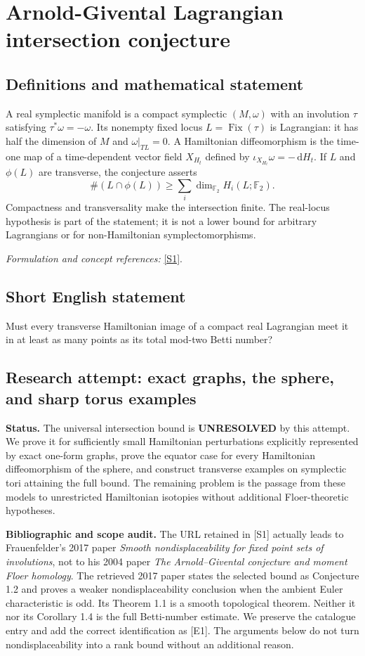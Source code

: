 \documentclass[11pt]{article}
\begin{document}
\section*{\texorpdfstring{Arnold-Givental Lagrangian intersection conjecture}{Arnold-Givental Lagrangian intersection conjecture}}\label{395}
\subsection{Definitions and mathematical statement}
A real symplectic manifold is a compact symplectic $(M,\omega)$ with an involution $\tau$ satisfying $\tau^*\omega=-\omega$. Its nonempty fixed locus $L=\operatorname{Fix}(\tau)$ is Lagrangian: it has half the dimension of $M$ and $\omega|_{TL}=0$. A Hamiltonian diffeomorphism is the time-one map of a time-dependent vector field $X_{H_t}$ defined by $\iota_{X_{H_t}}\omega=-{\,\mathrm{d}} H_t$. If $L$ and $\phi(L)$ are transverse, the conjecture asserts
\[
 \#(L\cap\phi(L))\ge\sum_i\dim_{{\mathbb{F}}_2}H_i(L;{\mathbb{F}}_2).
\]
Compactness and transversality make the intersection finite. The real-locus hypothesis is part of the statement; it is not a lower bound for arbitrary Lagrangians or for non-Hamiltonian symplectomorphisms.
\par\smallskip\textit{Formulation and concept references:} \href{https://arxiv.org/html/1708.09628v1}{[S1]}.

\subsection{Short English statement}
Must every transverse Hamiltonian image of a compact real Lagrangian meet it in at least as many points as its total mod-two Betti number?
\subsection{Research attempt: exact graphs, the sphere, and sharp torus examples}
\textbf{Status.} The universal intersection bound is \textbf{UNRESOLVED} by this attempt. We prove it for sufficiently small Hamiltonian perturbations explicitly represented by exact one-form graphs, prove the equator case for every Hamiltonian diffeomorphism of the sphere, and construct transverse examples on symplectic tori attaining the full bound. The remaining problem is the passage from these models to unrestricted Hamiltonian isotopies without additional Floer-theoretic hypotheses.

\textbf{Bibliographic and scope audit.} The URL retained in [S1] actually leads to Frauenfelder's 2017 paper \emph{Smooth nondisplaceability for fixed point sets of involutions}, not to his 2004 paper \emph{The Arnold--Givental conjecture and moment Floer homology}. The retrieved 2017 paper states the selected bound as Conjecture 1.2 and proves a weaker nondisplaceability conclusion when the ambient Euler characteristic is odd. Its Theorem 1.1 is a smooth topological theorem. Neither it nor its Corollary 1.4 is the full Betti-number estimate. We preserve the catalogue entry and add the correct identification as [E1]. The arguments below do not turn nondisplaceability into a rank bound without an additional reason.
\end{document}
